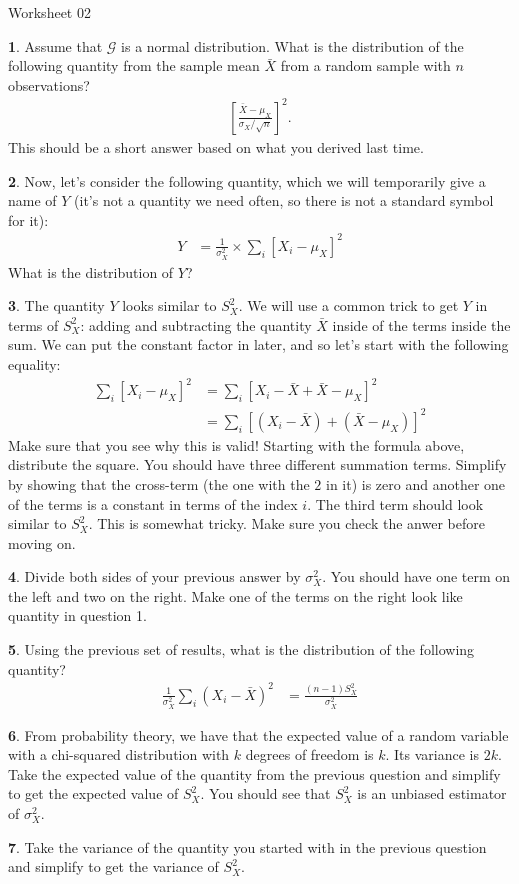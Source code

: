 \documentclass{tufte-handout}
\begin{document}
\justify

{\LARGE Worksheet 02}

\vspace*{18pt}


\textbf{1}. Assume that $\mathcal{G}$ is a normal distribution. What is the distribution
of the following quantity from the sample mean $\bar{X}$ from a random sample
with $n$ observations?
\begin{align*}
\left[\frac{\bar{X} - \mu_X}{\sigma_X / \sqrt{n}} \right]^2.
\end{align*}
This should be a short answer based on what you derived last time.

\textbf{2}. Now, let's consider the following quantity, which we will temporarily
give a name of $Y$ (it's not a quantity we need often, so there is not
a standard symbol for it):
\begin{align*}
Y &= \frac{1}{\sigma_X^2} \times \sum_i \left[ X_i - \mu_X \right]^2 
\end{align*}
What is the distribution of $Y$?

\textbf{3}. The quantity $Y$ looks similar to $S_X^2$. We will use a common trick to
get $Y$ in terms of $S_X^2$: adding and subtracting the quantity $\bar{X}$
inside of the terms inside the sum. We can put the constant factor in later,
and so let's start with the following equality:
\begin{align*}
\sum_i \left[ X_i - \mu_X \right]^2 &= \sum_i \left[ X_i - \bar{X} + \bar{X} - \mu_X \right]^2  \\
&= \sum_i \left[ (X_i - \bar{X}) + (\bar{X} - \mu_X) \right]^2 
\end{align*}
Make sure that you see why this is valid! Starting with the
formula above, distribute the square. You should have three different summation
terms. Simplify by showing that the cross-term (the one with the $2$ in it) is
zero and another one of the terms is a constant in terms of the index $i$. The
third term should look similar to $S_X^2$. This is somewhat tricky. Make sure
you check the anwer before moving on.

\textbf{4}. Divide both sides of your previous answer by $\sigma_X^2$. You
should have one term on the left and two on the right. Make one of the terms
on the right look like quantity in question 1.

\textbf{5}. Using the previous set of results, what is the distribution of
the following quantity?
\begin{align*}
\frac{1}{\sigma_X^2} \sum_i (X_i - \bar{X})^2 &= \frac{(n-1) S_X^2}{\sigma_X^2}
\end{align*}

\textbf{6}. From probability theory, we have that the expected value of a random variable with
a chi-squared distribution with $k$ degrees of freedom is $k$. Its variance is $2k$.
Take the expected value of the quantity from the previous question and
simplify to get the expected value of $S_X^2$. You should see that $S_X^2$ is
an unbiased estimator of $\sigma_X^2$.

\textbf{7}. Take the
variance of the quantity you started with in the previous question and simplify
to get the variance of $S_X^2$.
\end{document}
